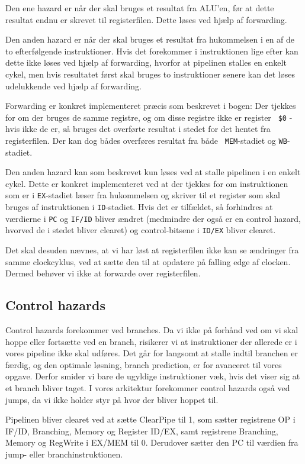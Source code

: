 Den ene hazard er når der skal bruges et resultat fra ALU'en, før at dette resultat endnu er skrevet
til registerfilen. Dette løses ved hjælp af forwarding.

Den anden hazard er når der skal bruges et resultat fra hukommelsen i en af de
to efterfølgende instruktioner. Hvis det forekommer i instruktionen lige efter
kan dette ikke løses ved hjælp af forwarding, hvorfor at pipelinen stalles en
enkelt cykel, men hvis resultatet først skal bruges to instruktioner senere kan
det løses udelukkende ved hjælp af forwarding.

Forwarding er konkret implementeret præcis som beskrevet i bogen: Der tjekkes
for om der bruges de samme registre, og om disse registre ikke er register {\tt
\$0} - hvis ikke de er, så bruges det overførte resultat i stedet for det hentet
fra registerfilen. Der kan dog bådes overføres resultat fra både {\tt 
MEM}-stadiet og {\tt WB}-stadiet.

Den anden hazard kan som beskrevet kun løses ved at stalle pipelinen i en enkelt
cykel. Dette er konkret implementeret ved at der tjekkes for om instruktionen 
som er i {\tt EX}-stadiet læser fra hukommelsen og skriver til et register som 
skal bruges af instruktionen i {\tt ID}-stadiet. Hvis det er tilfældet, så 
forhindres at værdierne i {\tt PC} og {\tt IF/ID} bliver ændret (medmindre der 
også er en control hazard, hvorved de i stedet bliver clearet) og
control-bitsene i {\tt ID/EX} bliver clearet.

Det skal desuden nævnes, at vi har løst at registerfilen ikke kan se ændringer fra
samme clockcyklus, ved at sætte den til at opdatere på falling edge af clocken.
Dermed behøver vi ikke at forwarde over registerfilen.

\subsection{Control hazards}
Control hazards forekommer ved branches. Da vi ikke på forhånd ved om vi skal hoppe
eller fortsætte ved en branch, risikerer vi at instruktioner der allerede er i vores
pipeline ikke skal udføres. Det går for langsomt at stalle indtil branchen er færdig,
og den optimale løsning, branch prediction, er for avanceret til vores opgave. Derfor
smider vi bare de ugyldige instruktioner væk, hvis det viser sig at et branch bliver taget.
I vores arkitektur forekommer control hazards også ved jumps, da vi ikke holder styr på hvor
der bliver hoppet til.

Pipelinen bliver clearet ved at sætte ClearPipe til 1, som sætter registrene OP i IF/ID, Branching, Memory og Register
ID/EX, samt registrene Branching, Memory og RegWrite i EX/MEM til 0. Derudover sætter den PC til værdien
fra jump- eller branchinstruktionen. 

